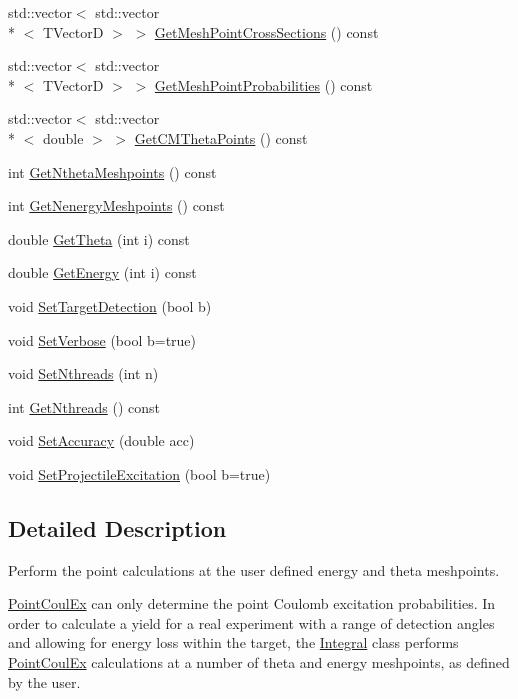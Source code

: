 \begin{DoxyCompactItemize}
std\-::vector$<$ std\-::vector\\*
$<$ T\-Vector\-D $>$ $>$ \hyperlink{classIntegral_afb5537a85f73c946ef995c1c1a59f909}{Get\-Mesh\-Point\-Cross\-Sections} () const 
\item 
std\-::vector$<$ std\-::vector\\*
$<$ T\-Vector\-D $>$ $>$ \hyperlink{classIntegral_a034a680b2e03a448d8a34ca635570833}{Get\-Mesh\-Point\-Probabilities} () const 
\item 
std\-::vector$<$ std\-::vector\\*
$<$ double $>$ $>$ \hyperlink{classIntegral_a79c05e036d4bde6f0a4b58c43609341a}{Get\-C\-M\-Theta\-Points} () const 
\item 
int \hyperlink{classIntegral_a37791a2bc8dd6640b26aa9c360c2d805}{Get\-Ntheta\-Meshpoints} () const 
\item 
int \hyperlink{classIntegral_af7d797162b618f3208c8bef4c9f7eeb7}{Get\-Nenergy\-Meshpoints} () const 
\item 
double \hyperlink{classIntegral_acc8a52e50e9686382b268ac8d1de39e5}{Get\-Theta} (int i) const 
\item 
double \hyperlink{classIntegral_a52dcb2c1604ffa118afd970ca542add8}{Get\-Energy} (int i) const 
\item 
void \hyperlink{classIntegral_a81fa56a28123bee80b550d4f7eb01077}{Set\-Target\-Detection} (bool b)
\item 
void \hyperlink{classIntegral_a8becba09d3bc70a3eb3b6efe2322f2f2}{Set\-Verbose} (bool b=true)
\item 
void \hyperlink{classIntegral_a84f4e01efa07c82a073b7dec58fe0c4e}{Set\-Nthreads} (int n)
\item 
int \hyperlink{classIntegral_a61b3f87d0639f4bf96e9a2fcf9ba4111}{Get\-Nthreads} () const 
\item 
void \hyperlink{classIntegral_a303ccbd05093c67ce911a016bb799392}{Set\-Accuracy} (double acc)
\item 
void \hyperlink{classIntegral_a3d7ffeb56e3b5da4567b7c66e7d495cc}{Set\-Projectile\-Excitation} (bool b=true)
\end{DoxyCompactItemize}


\subsection{Detailed Description}
Perform the point calculations at the user defined energy and theta meshpoints. 

\hyperlink{classPointCoulEx}{Point\-Coul\-Ex} can only determine the point Coulomb excitation probabilities. In order to calculate a yield for a real experiment with a range of detection angles and allowing for energy loss within the target, the \hyperlink{classIntegral}{Integral} class performs \hyperlink{classPointCoulEx}{Point\-Coul\-Ex} calculations at a number of theta and energy meshpoints, as defined by the user.

